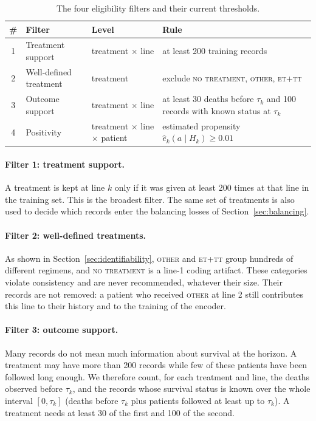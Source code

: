 \documentclass[a4paper,10pt]{article}
\begin{document}
\begin{table}[h]
\centering
\begin{tabular}{cllp{7.5cm}}
\toprule
\textbf{\#} & \textbf{Filter} & \textbf{Level} & \textbf{Rule} \\
\midrule
1 & Treatment support & treatment $\times$ line & at least 200 training records \\
2 & Well-defined treatment & treatment & exclude \textsc{no treatment}, \textsc{other}, \textsc{et+tt} \\
3 & Outcome support & treatment $\times$ line & at least 30 deaths before $\tau_k$ and 100 records with known status at $\tau_k$ \\
4 & Positivity & treatment $\times$ line $\times$ patient & estimated propensity $\hat{e}_k(a \mid H_k) \geq 0.01$ \\
\bottomrule
\end{tabular}
\caption{The four eligibility filters and their current thresholds.}
\label{tab:filters}
\end{table}

\paragraph{Filter 1: treatment support.} A treatment is kept at line $k$ only if it was given at least 200 times at that line in the training set. This is the broadest filter. The same set of treatments is also used to decide which records enter the balancing losses of Section~\ref{sec:balancing}.

\paragraph{Filter 2: well-defined treatments.} As shown in Section~\ref{sec:identifiability}, \textsc{other} and \textsc{et+tt} group hundreds of different regimens, and \textsc{no treatment} is a line-1 coding artifact. These categories violate consistency and are never recommended, whatever their size. Their records are not removed: a patient who received \textsc{other} at line 2 still contributes this line to their history and to the training of the encoder.

\paragraph{Filter 3: outcome support.} Many records do not mean much information about survival at the horizon. A treatment may have more than 200 records while few of these patients have been followed long enough. We therefore count, for each treatment and line, the deaths observed before $\tau_k$, and the records whose survival status is known over the whole interval $[0, \tau_k]$ (deaths before $\tau_k$ plus patients followed at least up to $\tau_k$). A treatment needs at least 30 of the first and 100 of the second.
\end{document}
